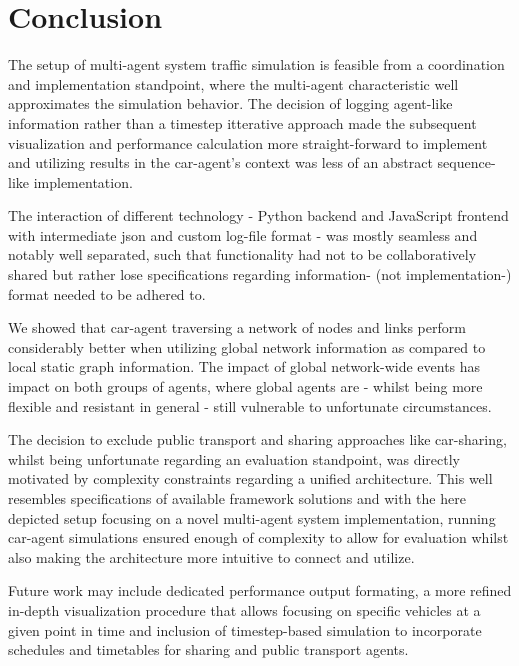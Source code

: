 \section{Conclusion}\label{sec:conclusion}

The setup of multi-agent system traffic simulation is feasible from a coordination and implementation standpoint, where the multi-agent characteristic well approximates the simulation behavior. The decision of logging agent-like information rather than a timestep itterative approach made the subsequent visualization and performance calculation more straight-forward to implement and utilizing results in the car-agent's context was less of an abstract sequence-like implementation.

The interaction of different technology - Python backend and JavaScript frontend with intermediate json and custom log-file format - was mostly seamless and notably well separated, such that functionality had not to be collaboratively shared but rather lose specifications regarding information- (not implementation-) format needed to be adhered to.

We showed that car-agent traversing a network of nodes and links perform considerably better when utilizing global network information as compared to local static graph information. The impact of global network-wide events has impact on both groups of agents, where global agents are - whilst being more flexible and resistant in general - still vulnerable to unfortunate circumstances.

The decision to exclude public transport and sharing approaches like car-sharing, whilst being unfortunate regarding an evaluation standpoint, was directly motivated by complexity constraints regarding a unified architecture. This well resembles specifications of available framework solutions and with the here depicted setup focusing on a novel multi-agent system implementation, running car-agent simulations ensured enough of complexity to allow for evaluation whilst also making the architecture more intuitive to connect and utilize.

Future work may include dedicated performance output formating, a more refined in-depth visualization procedure that allows focusing on specific vehicles at a given point in time and inclusion of timestep-based simulation to incorporate schedules and timetables for sharing and public transport agents.
